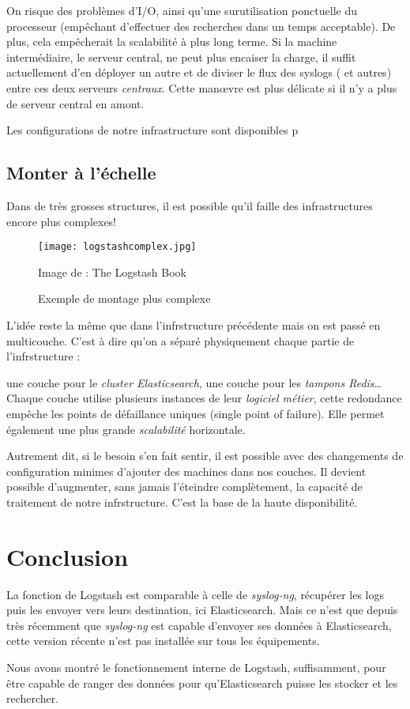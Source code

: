 On risque des problèmes d'I/O, ainsi qu'une surutilisation ponctuelle du processeur
(empêchant d'effectuer des recherches dans un temps acceptable).
De plus, cela empêcherait la scalabilité à plus long terme. 
Si la machine intermédiaire, le serveur central, ne peut plus encaiser la charge, 
il suffit actuellement d'en déployer un autre et de diviser le flux des syslogs (
et autres) entre ces deux serveurs \textit{centraux}. Cette manœvre est plus délicate 
si il n'y a plus de serveur central en amont.

Les configurations de notre infrastructure sont disponibles p\pageref{sec:codeprod}


\subsection{Monter à l'échelle}
Dans de très grosses structures, il est possible qu'il faille des infrastructures
encore plus complexes!

\begin{figure}[H]
\center
\texttt{[image: logstashcomplex.jpg]}
\label{fig:logstashcomplex}
\caption{Exemple de montage plus complexe}
{\footnotesize Image de : The Logstash Book}
\end{figure}

L'idée reste la même que dans l'infrstructure précédente mais on est passé en multicouche.
C'est à dire qu'on a séparé physiquement chaque partie de l'infrstructure : 

une couche pour le \textit{cluster Elasticsearch}, une couche pour les \textit{tampons Redis}\ldots
Chaque couche utilise plusieurs instances de leur \textit{logiciel métier}, cette redondance empêche les
points de défaillance uniques (single point of failure). Elle permet également une
plus grande \textit{scalabilité} horizontale. 

Autrement dit, si le besoin s'en fait
sentir, il est possible avec des changements de configuration minimes d'ajouter
des machines dans nos couches. Il devient possible d'augmenter, sans jamais l'éteindre
complètement, la capacité de traitement de notre infrstructure. C'est la base de la
haute disponibilité.


\section{Conclusion}
La fonction de Logstash est comparable à celle de \textit{syslog-ng}, récupérer les 
logs puis les envoyer vers leurs destination, ici Elasticsearch. Mais ce n'est que 
depuis très récemment que \textit{syslog-ng} est capable d'envoyer ses données à 
Elasticsearch, cette version récente n'est pas installée sur tous les équipements. 

Nous avons montré le fonctionnement interne de Logstash, suffisamment, 
pour être capable de ranger des données pour qu'Elasticsearch puisse les stocker
et les rechercher.


